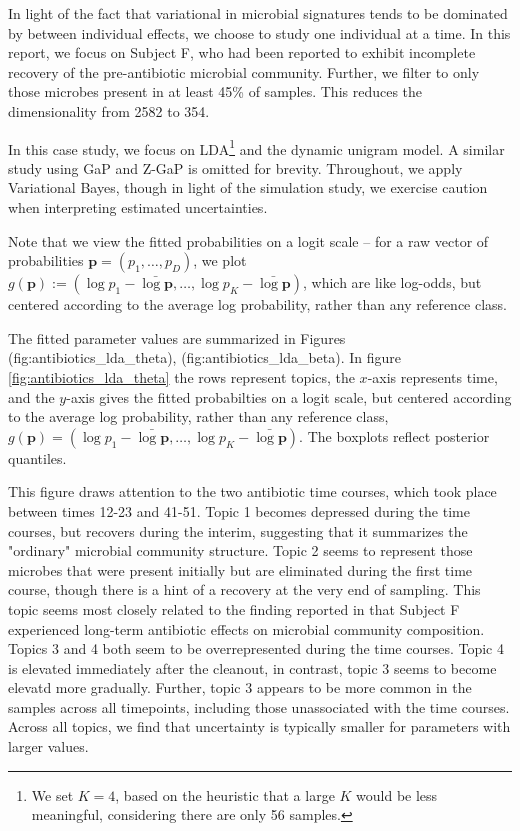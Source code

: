 \documentclass[oupdraft]{bio}
\begin{document}
In light of the fact that variational in microbial signatures tends to be
dominated by between individual effects, we choose to study one individual at a
time. In this report, we focus on Subject F, who had been reported to exhibit
incomplete recovery of the pre-antibiotic microbial community. Further, we
filter to only those microbes present in at least 45\% of samples. This reduces
the dimensionality from 2582 to 354.

In this case study, we focus on LDA\footnote{We set $K = 4$, based on the
  heuristic that a large $K$ would be less meaningful, considering there are
  only 56 samples.} and the dynamic unigram model. A similar study using GaP and
Z-GaP is omitted for brevity. Throughout, we apply Variational Bayes, though in
light of the simulation study, we exercise caution when interpreting estimated
uncertainties.

Note that we view the fitted probabilities on a logit scale -- for a raw vector
of probabilities $\mathbf{p} = \left(p_{1}, \dots, p_{D}\right)$, we plot
$g\left(\mathbf{p}\right) := \left(\log p_{1} - \bar{\log \mathbf{p}}, \dots,
\log p_{K} - \bar{\log \mathbf{p}}\right)$, which are like log-odds, but
centered according to the average log probability, rather than any reference
class.

The fitted parameter values are summarized in Figures
\@ref(fig:antibiotics_lda_theta), \@ref(fig:antibiotics_lda_beta).
In figure \ref{fig:antibiotics_lda_theta} the rows represent topics, the
$x$-axis represents time, and the $y$-axis gives the fitted probabilties on a
logit scale, but centered according to the average log probability, rather than
any reference class, $g\left(\mathbf{p}\right) = \left(\log p_{1} - \bar{\log
  \mathbf{p}}, \dots, \log p_{K} - \bar{\log \mathbf{p}}\right)$. The boxplots
reflect posterior quantiles.

This figure draws attention to the two antibiotic time courses, which took place
between times 12-23 and 41-51. Topic 1 becomes depressed during the time
courses, but recovers during the interim, suggesting that it summarizes the
"ordinary" microbial community structure. Topic 2 seems to represent those
microbes that were present initially but are eliminated during the first time
course, though there is a hint of a recovery at the very end of sampling. This
topic seems most closely related to the finding reported in
\cite{dethlefsen2011incomplete} that Subject F experienced long-term antibiotic
effects on microbial community composition. Topics 3 and 4 both seem to be
overrepresented during the time courses. Topic 4 is elevated immediately after
the cleanout, in contrast, topic 3 seems to become elevatd more gradually.
Further, topic 3 appears to be more common in the samples across all timepoints,
including those unassociated with the time courses. Across all topics, we find
that uncertainty is typically smaller for parameters with larger values.
\end{document}

